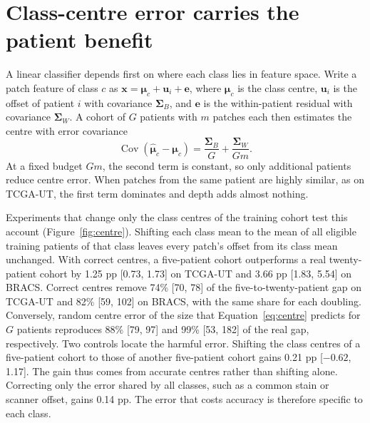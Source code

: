 \documentclass[11pt]{article}
\begin{document}
\section{Class-centre error carries the patient benefit}
A linear classifier depends first on where each class lies in feature space. Write a patch feature of class $c$ as $\mathbf x=\boldsymbol\mu_c+\mathbf u_i+\mathbf e$, where $\boldsymbol\mu_c$ is the class centre, $\mathbf u_i$ is the offset of patient $i$ with covariance $\boldsymbol\Sigma_B$, and $\mathbf e$ is the within-patient residual with covariance $\boldsymbol\Sigma_W$. A cohort of $G$ patients with $m$ patches each then estimates the centre with error covariance
\begin{equation}
  \operatorname{Cov}(\hat{\boldsymbol\mu}_c-\boldsymbol\mu_c)=\frac{\boldsymbol\Sigma_B}{G}+\frac{\boldsymbol\Sigma_W}{Gm}.
  \label{eq:centre}
\end{equation}
At a fixed budget $Gm$, the second term is constant, so only additional patients reduce centre error. When patches from the same patient are highly similar, as on TCGA-UT, the first term dominates and depth adds almost nothing.

Experiments that change only the class centres of the training cohort test this account (Figure~\ref{fig:centre}). Shifting each class mean to the mean of all eligible training patients of that class leaves every patch's offset from its class mean unchanged. With correct centres, a five-patient cohort outperforms a real twenty-patient cohort by 1.25 pp [0.73, 1.73] on TCGA-UT and 3.66 pp [1.83, 5.54] on BRACS. Correct centres remove 74\% [70, 78] of the five-to-twenty-patient gap on TCGA-UT and 82\% [59, 102] on BRACS, with the same share for each doubling. Conversely, random centre error of the size that Equation~\eqref{eq:centre} predicts for $G$ patients reproduces 88\% [79, 97] and 99\% [53, 182] of the real gap, respectively. Two controls locate the harmful error. Shifting the class centres of a five-patient cohort to those of another five-patient cohort gains 0.21 pp [$-0.62$, 1.17]. The gain thus comes from accurate centres rather than shifting alone. Correcting only the error shared by all classes, such as a common stain or scanner offset, gains 0.14 pp. The error that costs accuracy is therefore specific to each class.
\end{document}
